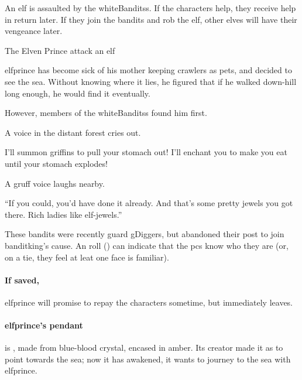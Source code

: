 \label{littleprince}

\noindent
An elf is assaulted by the \glspl{whiteBandits}.
If the characters help, they receive help in return later.
If they join the bandits and rob the elf, other elves will have their vengeance later.

{The Elven Prince}%
{ attack an elf}%

\begin{exampletext}
  \Gls{elfprince} has become sick of his mother keeping \glspl{crawler} as pets, and decided to see the sea.
  Without knowing where it lies, he figured that if he walked down-hill long enough, he would find it eventually.
\end{exampletext}

However, members of the \glspl{whiteBandits} found him first.

\begin{boxtext}
  A voice in the distant forest cries out.
  \begin{speechtext}
    I'll summon griffins to pull your stomach out!  I'll enchant you to make you eat until your stomach explodes!
  \end{speechtext}

  A gruff voice laughs nearby.

  \begin{speechtext}
    ``If you could, you'd have done it already.  And that's some pretty jewels you got there.  Rich ladies like elf-jewels.''
  \end{speechtext}

\end{boxtext}


These bandits were recently \gls{guard} \glspl{gDigger}, but abandoned their post to join \gls{banditking}'s cause.
An  roll (\tn[10]) can indicate that the \glspl{pc} know who they are (or, on a tie, they feel at leat one face is familiar).

\paragraph{If saved,}
\gls{elfprince} will promise to repay the characters sometime, but immediately leaves.

\paragraph{\Gls{elfprince}'s pendant}
is , made from blue-blood crystal, encased in amber.
Its creator made it as  to point towards the sea; now it has awakened, it wants to journey to the sea with \gls{elfprince}.

